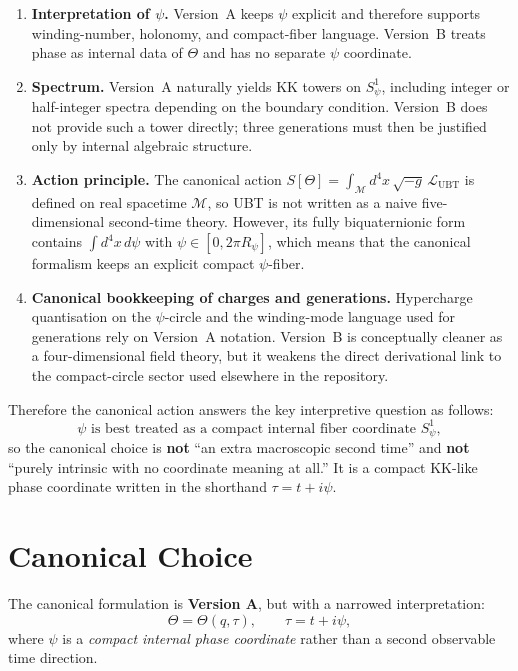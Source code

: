 \documentclass[12pt,a4paper]{article}
\begin{document}
\begin{enumerate}
  \item \textbf{Interpretation of $\psi$.}
  Version~A keeps $\psi$ explicit and therefore supports winding-number,
  holonomy, and compact-fiber language.  Version~B treats phase as internal data
  of $\Theta$ and has no separate $\psi$ coordinate.

  \item \textbf{Spectrum.}
  Version~A naturally yields KK towers on $S^1_\psi$, including integer or
  half-integer spectra depending on the boundary condition.  Version~B does not
  provide such a tower directly; three generations must then be justified only
  by internal algebraic structure.

  \item \textbf{Action principle.}
  The canonical action
  \(
  S[\Theta]=\int_{\mathcal{M}} d^4x\,\sqrt{-g}\,\mathcal{L}_{\mathrm{UBT}}
  \)
  is defined on real spacetime \(\mathcal{M}\), so UBT is not written as a
  naive five-dimensional second-time theory.  However, its fully biquaternionic
  form contains
  \(
  \int d^4x\,d\psi
  \)
  with \(\psi\in[0,2\pi R_\psi]\), which means that the canonical formalism
  keeps an explicit compact \(\psi\)-fiber.

  \item \textbf{Canonical bookkeeping of charges and generations.}
  Hypercharge quantisation on the $\psi$-circle and the winding-mode language
  used for generations rely on Version~A notation.  Version~B is conceptually
  cleaner as a four-dimensional field theory, but it weakens the direct
  derivational link to the compact-circle sector used elsewhere in the
  repository.
\end{enumerate}

Therefore the canonical action answers the key interpretive question as follows:
\[
\psi \text{ is best treated as a compact internal fiber coordinate }S^1_\psi,
\]
so the canonical choice is \textbf{not} ``an extra macroscopic second time'' and
\textbf{not} ``purely intrinsic with no coordinate meaning at all.''  It is a
compact KK-like phase coordinate written in the shorthand \(\tau=t+i\psi\).

\section{Canonical Choice}

The canonical formulation is \textbf{Version A}, but with a narrowed
interpretation:
\[
\Theta=\Theta(q,\tau),\qquad \tau=t+i\psi,
\]
where \(\psi\) is a \emph{compact internal phase coordinate} rather than a
second observable time direction.
\end{document}
